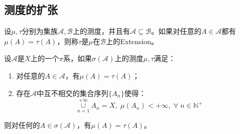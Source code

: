 \subsection{测度的扩张}
\begin{definition}
	设$\mu,\tau$分别为集族$\mathscr{A},\mathscr{B}$上的测度，并且有$\mathscr{A}\subseteq\mathscr{B}$。如果对任意的$A\in \mathscr{A}$都有$\mu(A)=\tau(A)$，则称$\tau$是$\mu$在$\mathscr{B}$上的\gls{Extension}。
\end{definition}
\begin{lemma}\label{lem:PiExtensionMeasure}
	设$\mathscr{A}$是$X$上的一个$\pi$系，如果$\sigma(\mathscr{A})$上的测度$\mu,\tau$满足：
	\begin{enumerate}
		\item 对任意的$A\in \mathscr{A}$，有$\mu(A)=\tau(A)$；
		\item 存在$\mathscr{A}$中互不相交的集合序列$\{A_n\}$使得：
		\begin{equation*}
			\underset{n=1}{\overset{+\infty}{\cup}}A_n=X,\;\mu(A_n)<+\infty,\;\forall\;n\in\mathbb{N}^+
		\end{equation*}
	\end{enumerate}
	则对任何的$A\in\sigma(\mathscr{A})$，有$\mu(A)=\tau(A)$。
\end{lemma}
